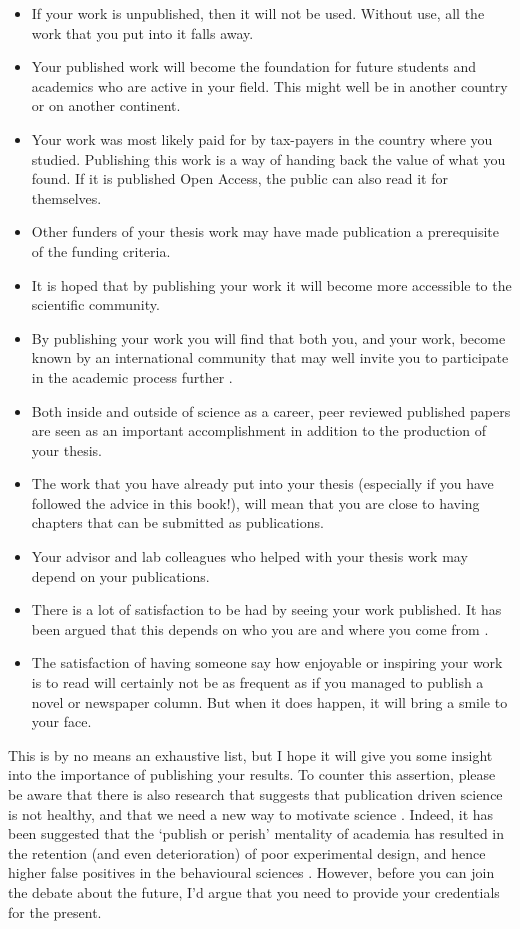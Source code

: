 \documentclass[
]{krantz}
\providecommand{\tightlist}{%
  \setlength{\itemsep}{0pt}\setlength{\parskip}{0pt}}
\begin{document}
\begin{itemize}
\tightlist
\item
  If your work is unpublished, then it will not be used. Without use, all the work that you put into it falls away.
\item
  Your published work will become the foundation for future students and academics who are active in your field. This might well be in another country or on another continent.
\item
  Your work was most likely paid for by tax-payers in the country where you studied. Publishing this work is a way of handing back the value of what you found. If it is published Open Access, the public can also read it for themselves.
\item
  Other funders of your thesis work may have made publication a prerequisite of the funding criteria.
\item
  It is hoped that by publishing your work it will become more accessible to the scientific community.
\item
  By publishing your work you will find that both you, and your work, become known by an international community that may well invite you to participate in the academic process further \citep{marks2013misuse}.
\item
  Both inside and outside of science as a career, peer reviewed published papers are seen as an important accomplishment in addition to the production of your thesis.
\item
  The work that you have already put into your thesis (especially if you have followed the advice in this book!), will mean that you are close to having chapters that can be submitted as publications.
\item
  Your advisor and lab colleagues who helped with your thesis work may depend on your publications.
\item
  There is a lot of satisfaction to be had by seeing your work published. It has been argued that this depends on who you are and where you come from \citep{husemann2017publicationism}.
\item
  The satisfaction of having someone say how enjoyable or inspiring your work is to read will certainly not be as frequent as if you managed to publish a novel or newspaper column. But when it does happen, it will bring a smile to your face.
\end{itemize}

This is by no means an exhaustive list, but I hope it will give you some insight into the importance of publishing your results. To counter this assertion, please be aware that there is also research that suggests that publication driven science is not healthy, and that we need a new way to motivate science \citep[e.g.][]{stergiou2014impact}. Indeed, it has been suggested that the `publish or perish' mentality of academia has resulted in the retention (and even deterioration) of poor experimental design, and hence higher false positives in the behavioural sciences \citep{smaldino2016natural}. However, before you can join the debate about the future, I'd argue that you need to provide your credentials for the present.
\end{document}
